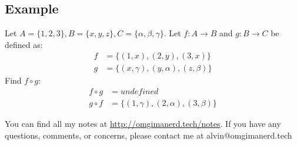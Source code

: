 \documentclass{math}
\begin{document}
\subsection*{Example}
Let \( A = \{1,2,3\}, B = \{x,y,z\}, C = \{\alpha,\beta,\gamma\} \). Let
\( f:A\to B \) and \( g:B\to C \) be defined as:
\begin{align*}
  f &= \{(1,x),(2,y),(3,x)\} \\
  g &= \{(x,\gamma),(y,\alpha),(z,\beta)\}
\end{align*}
Find \( f\circ g \):
\begin{align*}
  f\circ g &= undefined \\
  g\circ f &= \{(1,\gamma),(2,\alpha),(3,\beta)\}
\end{align*}

\begin{center}
  You can find all my notes at \url{http://omgimanerd.tech/notes}. If you have
  any questions, comments, or concerns, please contact me at
  alvin@omgimanerd.tech
\end{center}
\end{document}
